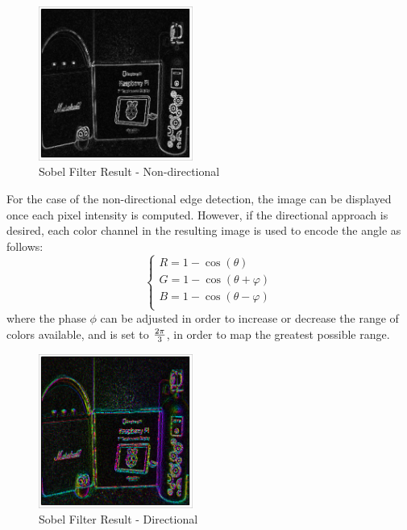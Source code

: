 \begin{figure}[H]
	\includegraphics[width=0.45\textwidth, height=0.45\textwidth]{resources/Sobel_2.png}
	\caption{Sobel Filter Result - Non-directional}
\end{figure}

For the case of the non-directional edge detection, the image can be displayed once each pixel intensity is
computed. However, if the directional approach is desired, each color channel in the resulting image is used
to encode the angle as follows:
\begin{equation}
	\label{eq:sobelRGB}
	\begin{cases}
		R = {1 - \cos(\theta)}           \\
		G = {1 - \cos(\theta + \varphi)} \\
		B = {1 - \cos(\theta - \varphi)} \\
	\end{cases}
\end{equation}
where the phase \(\phi\) can be adjusted in order to increase or decrease the range of colors available, and
is set to \(2\pi\over3\), in order to map the greatest possible range.

\begin{figure}[H]
	\includegraphics[width=0.45\textwidth, height=0.45\textwidth]{resources/Sobel_6.png}
	\caption{Sobel Filter Result - Directional}
\end{figure}

